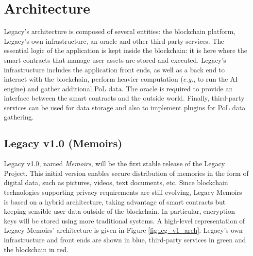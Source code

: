 \chapter{Architecture} %
\label{cha:architecture}

Legacy’s architecture is composed of several entities: the blockchain platform, Legacy’s own infrastructure, an oracle and other third-party services. 
The essential logic of the application is kept inside the blockchain: it is here where the smart contracts that manage user assets are stored and executed. 
Legacy's infrastructure includes the application front ends, as well as a back end to interact with the blockchain, perform heavier computation (\textit{e.g.}, to run the AI engine) and gather additional PoL data.
The oracle is required to provide an interface between the smart contracts and the outside world.
Finally, third-party services can be used for data storage and also to implement plugins for PoL data gathering.


\section{Legacy v1.0 (Memoirs)} %
\label{sec:legacy_v1_0_memoirs_a_hybrid_architecture}
Legacy v1.0, named \textit{Memoirs}, will be the first stable release of the Legacy Project. This initial version enables secure distribution of memories in the form of digital data, such as pictures, videos, text documents, etc. 
Since blockchain technologies supporting privacy requirements are still evolving, Legacy Memoirs is based on a hybrid architecture, taking advantage of smart contracts but keeping sensible user data outside of the blockchain. In particular, encryption keys will be stored using more traditional systems.
A high-level representation of Legacy Memoirs’ architecture is given in Figure \ref{fig:leg_v1_arch}. Legacy’s own infrastructure and front ends are shown in blue, third-party services in green and the blockchain in red. 


